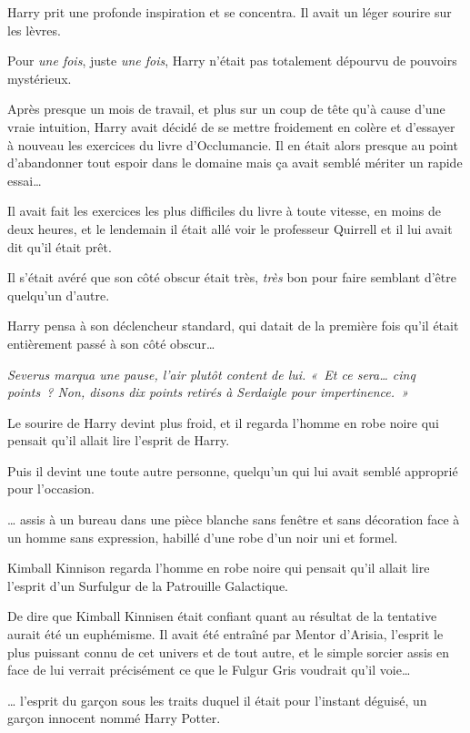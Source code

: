 Harry prit une profonde inspiration et se concentra. Il avait un léger sourire sur les lèvres.

Pour \emph{une fois}, juste \emph{une fois}, Harry n'était pas totalement dépourvu de pouvoirs mystérieux.

Après presque un mois de travail, et plus sur un coup de tête qu'à cause d'une vraie intuition, Harry avait décidé de se mettre froidement en colère et d'essayer à nouveau les exercices du livre d'Occlumancie. Il en était alors presque au point d'abandonner tout espoir dans le domaine mais ça avait semblé mériter un rapide essai…

Il avait fait les exercices les plus difficiles du livre à toute vitesse, en moins de deux heures, et le lendemain il était allé voir le professeur Quirrell et il lui avait dit qu'il était prêt.

Il s'était avéré que son côté obscur était très, \emph{très} bon pour faire semblant d'être quelqu'un d'autre.

Harry pensa à son déclencheur standard, qui datait de la première fois qu'il était entièrement passé à son côté obscur…

\emph{Severus marqua une pause, l'air plutôt content de lui. «~Et ce sera… cinq points~? Non, disons dix points retirés à Serdaigle pour impertinence.~»}

Le sourire de Harry devint plus froid, et il regarda l'homme en robe noire qui pensait qu'il allait lire l'esprit de Harry.

Puis il devint une toute autre personne, quelqu'un qui lui avait semblé approprié pour l'occasion.

\later

… assis à un bureau dans une pièce blanche sans fenêtre et sans décoration face à un homme sans expression, habillé d’une robe d'un noir uni et formel.

Kimball Kinnison regarda l'homme en robe noire qui pensait qu'il allait lire l'esprit d'un Surfulgur de la Patrouille Galactique.

De dire que Kimball Kinnisen était confiant quant au résultat de la tentative aurait été un euphémisme. Il avait été entraîné par Mentor d'Arisia, l'esprit le plus puissant connu de cet univers et de tout autre, et le simple sorcier assis en face de lui verrait précisément ce que le Fulgur Gris voudrait qu'il voie…

… l'esprit du garçon sous les traits duquel il était pour l'instant déguisé, un garçon innocent nommé Harry Potter.

